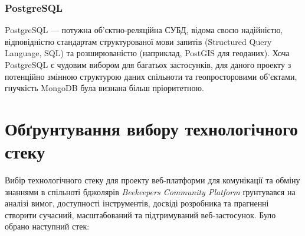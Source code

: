 \subsubsection{PostgreSQL}
PostgreSQL — потужна об'єктно-реляційна СУБД, відома своєю надійністю, відповідністю стандартам структурованої мови запитів (Structured Query Language, SQL) та розширюваністю (наприклад, PostGIS для геоданих). Хоча PostgreSQL є чудовим вибором для багатьох застосунків, для даного проекту з потенційно змінною структурою даних спільноти та геопросторовими об'єктами, гнучкість MongoDB була визнана більш пріоритетною.

\section{Обґрунтування вибору технологічного стеку}
\label{sec:tech_justification}
Вибір технологічного стеку для проекту веб-платформи для комунікації та обміну знаннями в спільноті бджолярів \textit{Beekeepers Community Platform} ґрунтувався на аналізі вимог, доступності інструментів, досвіді розробника та прагненні створити сучасний, масштабований та підтримуваний веб-застосунок. Було обрано наступний стек:
